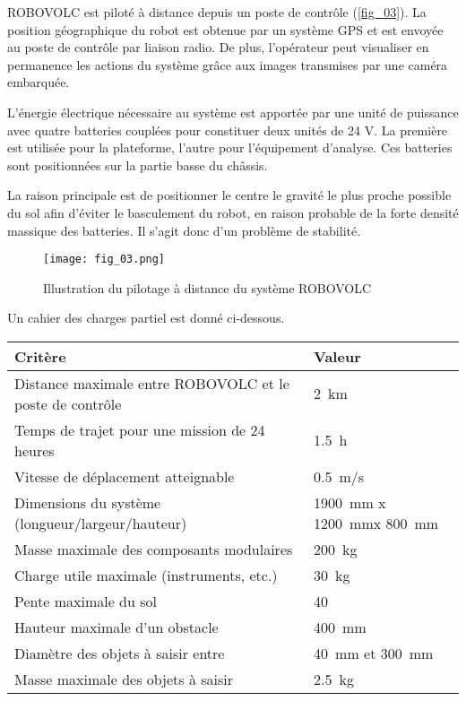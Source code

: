 \ifprof
\else
ROBOVOLC est piloté à distance depuis un poste de contrôle (\autoref{fig_03}). La position géographique
du robot est obtenue par un système GPS et est envoyée au poste de contrôle par liaison radio.
De plus, l’opérateur peut visualiser en permanence les actions du système grâce aux images
transmises par une caméra embarquée.

L'énergie électrique nécessaire au système est apportée par une unité de puissance avec quatre
batteries couplées pour constituer deux unités de 24 V. La première est utilisée pour la plateforme,
l'autre pour l'équipement d'analyse. Ces batteries sont positionnées sur la partie basse du châssis.
\fi

\ifprof
\begin{corrige}
 La raison principale est de positionner le centre le gravité le plus proche possible du sol afin d’éviter le basculement du robot, en raison probable de la forte densité massique des batteries. Il s’agit donc d’un problème de stabilité.
\end{corrige}
\else
\fi


\ifprof
\else
\begin{figure}[H]
\centering
\texttt{[image: fig\_03.png]}
\caption{Illustration du pilotage à distance du système ROBOVOLC\label{fig_03}}
\end{figure}

Un cahier des charges partiel est donné ci-dessous.

\begin{center}
\begin{tabular}{ll}
\hline
\textbf{Critère} & \textbf{Valeur} \\ \hline \hline
Distance maximale entre ROBOVOLC et le poste de contrôle & \SI{2}{km} \\ \hline  
Temps de trajet pour une mission de 24 heures 		& \SI{1,5}{h} \\ \hline 
Vitesse de déplacement atteignable 				& \SI{0,5}{m/s} \\ \hline 
Dimensions du système (longueur/largeur/hauteur) 		& \SI{1900}{mm} x \SI{1200}{mm}x \SI{800}{mm}\\ \hline 
Masse maximale des composants modulaires 			& \SI{200}{kg} \\ \hline 
Charge utile maximale (instruments, etc.) 			& \SI{30}{kg} \\ \hline 
Pente maximale du sol 						& 40\degres \\ \hline 
Hauteur maximale d'un obstacle 					& \SI{400}{mm} \\ \hline 
Diamètre des objets à saisir entre 				& \SI{40}{mm} et \SI{300}{mm} \\ \hline 
Masse maximale des objets à saisir 				& \SI{2,5}{kg} \\ \hline 
\end{tabular}
\end{center}

